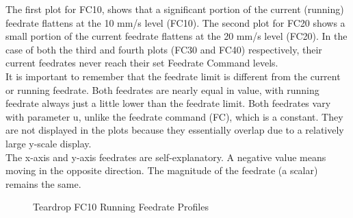 The first plot for FC10, shows that a significant portion of the current (running) feedrate flattens at the 10 mm/s level (FC10). The second plot for FC20 shows a small portion of the current feedrate flattens at the 20 mm/s level (FC20). In the case of both the third and fourth plots (FC30 and FC40) respectively, their current feedrates never reach their set Feedrate Command levels. \\

It is important to remember that the feedrate limit is different from the current or running feedrate. Both feedrates are nearly equal in value, with running feedrate always just a little lower than the feedrate limit. Both feedrates vary with parameter u, unlike the feedrate command (FC), which is a constant. They are not displayed in the plots because they essentially overlap due to a relatively large y-scale display.  \\

The x-axis and y-axis feedrates are self-explanatory. A negative value means moving in the opposite direction. The magnitude of the feedrate (a scalar) remains the same.


\clearpage
\pagebreak

\begin{figure}
	\caption  {Teardrop FC10 Running Feedrate Profiles}
	\label{img-chap4-Teardrop-FC10-Running-Feedrate-Profiles.pdf}
\end{figure}	

